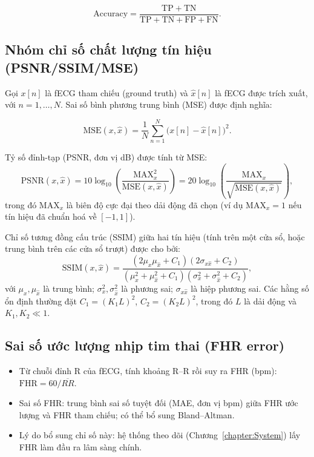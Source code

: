\documentclass[../DoAn.tex]{subfiles}
\begin{document}
\begin{equation}
\mathrm{Accuracy} = \frac{\mathrm{TP}+\mathrm{TN}}{\mathrm{TP}+\mathrm{TN}+\mathrm{FP}+\mathrm{FN}}.
\end{equation}

\subsection{Nhóm chỉ số chất lượng tín hiệu (PSNR/SSIM/MSE)}
Gọi $x[n]$ là fECG tham chiếu (ground truth) và $\hat{x}[n]$ là fECG được trích xuất, với $n=1,\dots,N$.
Sai số bình phương trung bình (MSE) được định nghĩa:

\begin{equation}
\mathrm{MSE}(x,\hat{x})=\frac{1}{N}\sum_{n=1}^{N}\big(x[n]-\hat{x}[n]\big)^2 .
\end{equation}

Tỷ số đỉnh-tạp (PSNR, đơn vị dB) được tính từ MSE:
\begin{equation}
\mathrm{PSNR}(x,\hat{x}) = 10\log_{10}\left(\frac{\mathrm{MAX}_x^2}{\mathrm{MSE}(x,\hat{x})}\right)
=20\log_{10}\left(\frac{\mathrm{MAX}_x}{\sqrt{\mathrm{MSE}(x,\hat{x})}}\right),
\end{equation}
trong đó $\mathrm{MAX}_x$ là biên độ cực đại theo dải động đã chọn (ví dụ $\mathrm{MAX}_x=1$ nếu tín hiệu đã chuẩn hoá về $[-1,1]$).

Chỉ số tương đồng cấu trúc (SSIM) giữa hai tín hiệu (tính trên một cửa sổ, hoặc trung bình trên các cửa sổ trượt) được cho bởi:
\begin{equation}
\mathrm{SSIM}(x,\hat{x})=
\frac{(2\mu_x\mu_{\hat{x}}+C_1)(2\sigma_{x\hat{x}}+C_2)}
{(\mu_x^2+\mu_{\hat{x}}^2+C_1)(\sigma_x^2+\sigma_{\hat{x}}^2+C_2)},
\end{equation}
với $\mu_x,\mu_{\hat{x}}$ là trung bình; $\sigma_x^2,\sigma_{\hat{x}}^2$ là phương sai; $\sigma_{x\hat{x}}$ là hiệp phương sai.
Các hằng số ổn định thường đặt $C_1=(K_1L)^2$, $C_2=(K_2L)^2$, trong đó $L$ là dải động và $K_1,K_2\ll 1$.

\subsection{Sai số ước lượng nhịp tim thai (FHR error)}
\begin{itemize}
  \item Từ chuỗi đỉnh R của fECG, tính khoảng R--R rồi suy ra FHR (bpm): $\mathrm{FHR}=60/\overline{RR}$.
  \item Sai số FHR: trung bình sai số tuyệt đối (MAE, đơn vị bpm) giữa FHR ước lượng và FHR tham chiếu; có thể bổ sung Bland--Altman.
  \item Lý do bổ sung chỉ số này: hệ thống theo dõi (Chương~\ref{chapter:System}) lấy FHR làm đầu ra lâm sàng chính.
\end{itemize}
\end{document}
